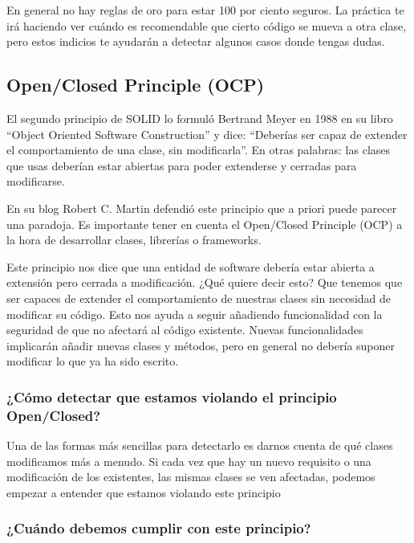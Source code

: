 \documentclass[12pt,letterpaper]{article}
\begin{document}
En general no hay reglas de oro para estar 100 por ciento seguros. La práctica te irá haciendo
ver cuándo es recomendable que cierto código se mueva a otra clase, pero estos
indicios te ayudarán a detectar algunos casos donde tengas dudas.
 


\subsection{ Open/Closed Principle (OCP)}
El segundo principio de SOLID lo formuló Bertrand Meyer en 1988 en su libro “Object Oriented Software Construction” y dice: “Deberías ser capaz de extender el comportamiento de una clase, sin modificarla”. En otras palabras: las clases que usas deberían estar abiertas para poder extenderse y cerradas para modificarse.

En su blog Robert C. Martin defendió este principio que a priori puede parecer una paradoja. Es importante tener en cuenta el Open/Closed Principle (OCP) a la hora de desarrollar clases, librerías o frameworks.

Este principio nos dice que una entidad de software debería estar abierta a
extensión pero cerrada a modificación. ¿Qué quiere decir esto? Que tenemos
que ser capaces de extender el comportamiento de nuestras clases sin necesidad
de modificar su código. Esto nos ayuda a seguir añadiendo funcionalidad con la
seguridad de que no afectará al código existente. Nuevas funcionalidades implicarán
añadir nuevas clases y métodos, pero en general no debería suponer modificar lo que
ya ha sido escrito.



\subsubsection{¿Cómo detectar que estamos violando el principio Open/Closed?}
Una de las formas más sencillas para detectarlo es darnos cuenta de qué clases modificamos más a menudo. Si cada vez que hay un nuevo requisito o una modificación
de los existentes, las mismas clases se ven afectadas, podemos empezar a entender
que estamos violando este principio




\subsubsection{¿Cuándo debemos cumplir con este principio?}
\end{document}
